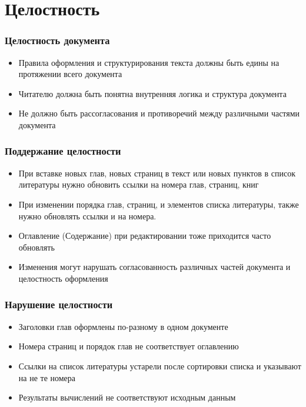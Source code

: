 \documentclass[10pt,pdf,hyperref={unicode}]{beamer}
\begin{document}
\section{Целостность}
\begin{frame}
\frametitle{Целостность документа}
\begin{itemize}
\item Правила оформления и структурирования текста должны быть едины на протяжении всего документа 
\item Читателю должна быть понятна внутренняя логика и структура документа
\item 	Не должно быть рассогласования и противоречий между различными частями документа 
\end{itemize}
\end{frame}
\begin{frame}
	\frametitle{Поддержание целостности}
	\begin{itemize}
		\item 	При вставке новых глав, новых страниц в текст или новых пунктов в список литературы нужно обновить ссылки на номера глав, страниц, книг
\item 	При изменении порядка глав, страниц, и  элементов списка литературы, также нужно обновлять ссылки и на номера.
\item 	Оглавление (Содержание) при редактировании тоже приходится часто обновлять
\item 	Изменения могут  нарушать согласованность различных частей документа и целостность оформления

	\end{itemize}
	
\end{frame}
\begin{frame}
	\frametitle{Нарушение целостности}
	\begin{itemize}
\item 	Заголовки глав оформлены по-разному в одном документе
\item 	Номера страниц и порядок глав не соответствует оглавлению 
\item 	Ссылки на список литературы устарели после сортировки списка и указывают на не те номера
\item   Результаты вычислений не соответствуют исходным данным
	\end{itemize}
\end{frame}
\end{document}
